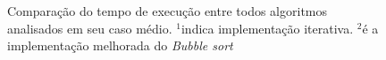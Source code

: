 \documentclass[12pt]{article}
\begin{document}
\begin{figure}[H]%
    \centering
    

    \caption{Comparação do tempo de execução entre todos algoritmos analisados em seu caso médio. $^1$indica implementação iterativa. $^2$é a implementação melhorada do \textit{Bubble sort}}%
\end{figure}
\end{document}
